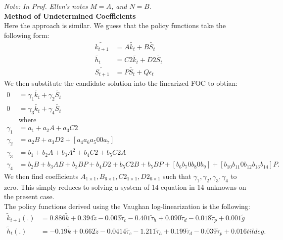 \documentclass[12pt]{article}
\begin{document}
\textit{Note: In Prof. Ellen's notes $M=A$, and $N = B$}. \\
\textbf{Method of Undetermined Coefficients}\\
Here the approach is similar. We guess that the policy functions take the following form:
\begin{align*}
\tilde{k_{t+1}} & = A \tilde{k_t} + B\tilde{S_t} \\
\tilde{h_t} & = C2 \tilde{k_t} + D2 \tilde{S_t} \\
\tilde{S_{t+1}} & = P\tilde{S_t} + Q \epsilon_t
\end{align*}
We then substitute the candidate solution into the linearized FOC to obtian:
\begin{align*}
0 & = \gamma_1 \tilde{k_t} + \gamma_2 \tilde{S_t} \\
0 & = \gamma_3 \tilde{k_t} + \gamma_4 \tilde{S_t} \\
& \text{where} \\
\gamma_1 & = a_1 + a_2A + a_3C2 \\
\gamma_2 & = a_2B + a_3D2 + [a_4 a_6 a_5 0 0 a_7] \\
\gamma_3 & = b_1 + b_2A + b_3A^2 + b_4C2 + b_5C2A \\
\gamma_4 & = b_2B + b_3 AB + b_3BP + b_4D2 + b_5C2B + b_5BP + [b_6 b_7 0 b_8 0 b_9] + [b_{10} b_{11} 0 b_{12} b_{13} b_{14}]P.
\end{align*}
We then find coefficients $A_{1\times1}, B_{6 \times 1}, C2_{1 \times 1}, D2_{6 \times 1}$  such that $\gamma_1, \gamma_2, \gamma_3, \gamma_4$ to zero. This simply reduces to solving a system of 14 equation in 14 unknowns on the present case. \\


The policy functions derived using the Vaughan log-linearization is the following:
\begin{align*}
\tilde{k}_{t+1}(.) & = 0.886 \tilde{k} + 0.394\tilde{z}  -0.003\tilde{\tau}_c  -0.401\tilde{\tau}_h  +0.090\tilde{\tau}_d -0.018\tilde{\tau}_p + 0.001 \tilde{g}\\
\tilde{h}_{t}(.) & = -0.19\tilde{k} + 0.662\tilde{z} -0.0414\tilde{\tau}_c -1.211\tilde{\tau}_h  +0.199\tilde{\tau}_d -0.039\tilde{\tau}_p +0.016tilde{g}.
\end{align*}
\end{document}
